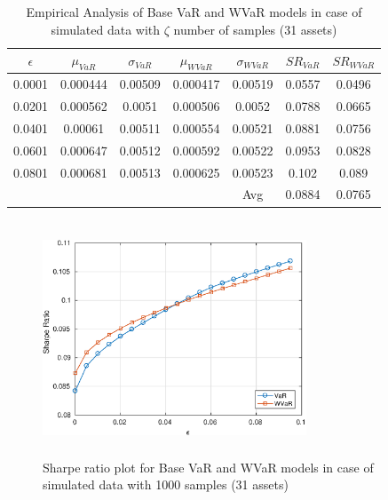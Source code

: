 \documentclass[12pt]{article}
\numberwithin{equation}{section}
\begin{document}
\begin{table}[!h]
\centering
\captionsetup{justification=centering}
\begin{tabular}{||c|c|c|c|c|c|c||}
\hline
$\epsilon$ & $\mu_{VaR}$ & $\sigma_{VaR}$ & $\mu_{WVaR}$ & $\sigma_{WVaR}$ & $SR_{VaR}$ & $SR_{WVaR}$\\
\hline
0.0001 & 0.000444 & 0.00509 & 0.000417 & 0.00519 & 0.0557 & 0.0496 \\
0.0201 & 0.000562 & 0.0051 & 0.000506 & 0.0052 & 0.0788 & 0.0665 \\
0.0401 & 0.00061 & 0.00511 & 0.000554 & 0.00521 & 0.0881 & 0.0756 \\
0.0601 & 0.000647 & 0.00512 & 0.000592 & 0.00522 & 0.0953 & 0.0828 \\
0.0801 & 0.000681 & 0.00513 & 0.000625 & 0.00523 & 0.102 & 0.089 \\
\hline
& & & & Avg & 0.0884 & 0.0765 \\
\hline
\end{tabular}
\caption{Empirical Analysis of Base VaR and WVaR models in case of simulated data with $\zeta$ number of samples (31 assets)}
\label{tab:5.2}
\end{table}

\begin{figure}[!h]
\centering
\includegraphics[height=7.0cm,width=0.7\textwidth]{VaR/bse30_simulated/sr_1000_cheb.eps}
\caption{Sharpe ratio plot for Base VaR and WVaR models in case of simulated data with 1000 samples (31 assets)}
\label{fig:5.3}
\end{figure}
\end{document}
